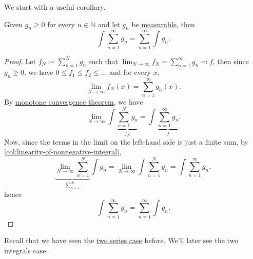 We start with a useful corollary.
\begin{corollary}\label{col:Tonelli-theorem-for-nonnegative-series-and-integrals}
	Given \(g_{n}\geq 0\) for every \(n\in\mathbb{N} \) and let \(g_{n}\) be \hyperref[def:measurable-function]{measurable}, then
	\[
		\int \sum_{n=1}^{\infty} g_{n} = \sum_{n=1}^{\infty} \int g_{n}.
	\]
\end{corollary}
\begin{proof}
	Let \(f_{N} \coloneqq \sum_{n=1}^{N} g_{n}\) such that \(\lim_{N \to \infty} f_{N} = \sum_{n=1}^{\infty} g_{n} \eqqcolon f\), then since \(g_{n}\geq 0\), we have \(0\leq f_{1}\leq f_{2}\leq \dots \) and for every \(x\),
	\[
		\lim_{N \to \infty} f_{N}(x) = \sum_{n=1}^{\infty} g_{n}(x).
	\]
	By \hyperref[thm:MCT]{monotone convergence theorem}, we have
	\[
		\lim_{N \to \infty} \int \underbrace{\sum_{n=1}^N g_{n}}_{f_{N}} = \int \underbrace{\sum_{n=1}^{\infty} g_{n }}_{f}.
	\]
	Now, since the terms in the limit on the left-hand side is just a finite sum, by \autoref{col:linearity-of-nonnegative-integral},
	\[
		\underbrace{\lim_{N \to \infty} \sum_{n=1}^{N}}_{\sum_{n=1}^{\infty} } \int g_{n} =\lim_{N \to \infty} \int \sum_{n=1}^N g_{n} = \int \sum_{n=1}^{\infty} g_{n},
	\]
	hence
	\[
		\int \sum_{n=1}^{\infty} g_{n} = \sum_{n=1}^{\infty} \int g_{n}.
	\]
\end{proof}

\begin{remark}
	Recall that we have seen the \hyperref[thm:Tonelli-for-series]{two series case} before. We'll later see the two integrals case.
\end{remark}

